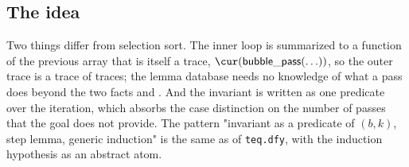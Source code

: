 \subsection{The idea}
Two things differ from selection sort. The inner loop is summarized to a function of the previous
array that is itself a trace, $\cur(\mathsf{bubble\_pass}(\ldots))$, so the outer trace is a trace of
traces; the lemma database needs no knowledge of what a pass does beyond the two facts
 and . And the invariant is written as one predicate over
the iteration, which absorbs the case distinction on the number of passes that the goal does not provide.
The pattern "invariant as a predicate of $(b, k)$, step lemma, generic induction" is the same as
 of \texttt{teq.dfy}, with the induction hypothesis as an abstract atom.
